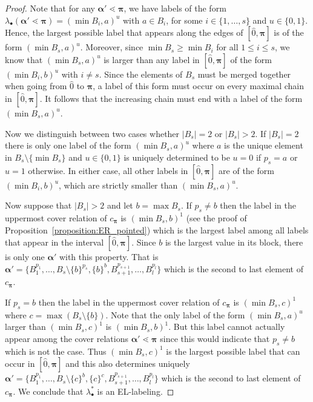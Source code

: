 \documentclass[11pt]{article}
\theoremstyle{definition}
\numberwithin{equation}{section}
\newcommand{\bpi}{\pmb{\pi}}
\newcommand{\balpha}{\pmb{\alpha}}
\begin{document}
\begin{proof}
Note that for any $\balpha'\lessdot \bpi$, we have labels of the form $\lambda_{\bullet}(\balpha'\lessdot \bpi)=(\min B_i,a)^u$ with $a\in B_i$, for some  $i\in\{1,\dots,s\}$ and $u\in\{0,1\}$. Hence,  the largest possible label that appears along the edges of $[\hat{0},\bpi]$ is of the form $(\min B_{s},a)^u$.  Moreover, since $\min B_s \geq \min B_i$ for all $1\leq i\leq s$, we know that $(\min B_{s},a)^u$ is larger than any label in $[\hat{0}, \bpi]$ of the form $(\min B_i, b)^u$ with $i\neq s$.   Since the elements of $B_s$ must be merged together when going from $\hat{0}$ to $\bpi$,  a label of this form must occur on every maximal chain in $[\hat{0},\bpi]$.  It follows that the increasing chain must end with a label of the form $(\min B_{s},a)^u$.  

Now we distinguish between two cases whether $|B_{s}|=2$ or $|B_{s}|>2$. If $|B_{s}|=2$ there is only one label of the form $(\min B_{s},a)^u$ where $a$ is the unique element in $B_{s}\setminus \{\min B_{s}\}$ and $u\in\{0,1\}$ is uniquely determined to be $u=0$ if $p_s=a$ or $u=1$ otherwise. In either case, all other labels in $[\hat{0},\bpi]$ are of the form $(\min B_{i},b)^u$, which are strictly smaller than $(\min B_{s},a)^u$.



Now suppose that $|B_{s}|>2$ and let $b=\max B_s$. If $p_s\neq b$ then the label in the uppermost cover relation of $c_{\bpi}$ is $(\min B_{s},b)^1$ (see the proof of Proposition~\ref{proposition:ER_pointed}) which is the largest label among all labels that appear in the interval $[\hat{0},\bpi]$.  Since $b$ is the largest value in its block, there is only one $\balpha'$ with this property. That is $\balpha'=\{B_1^{p_1},\dots,B_s\setminus\{b\}^{p_s},\{b\}^{b},B_{s+1}^{p_{s+1}},\dots,B_l^{p_l}\}$ which is the second to last element of $c_{\bpi}$. 

If $p_s= b$ then  the label in the uppermost cover relation of $c_{\bpi}$ is $(\min B_{s},c)^1$ where $c=\max (B_s \setminus \{b\})$. Note that the only label of the form $(\min B_{s},a)^u$ larger than   $(\min B_{s},c)^1$ is $(\min B_{s},b)^1$.   
But this label cannot actually appear among the cover relations  $\balpha'\lessdot \bpi$ since this would indicate that $p_s\neq b$ which is not the case. Thus $(\min B_{s},c)^1$ is the largest possible label that can occur  in $[\hat{0}, \bpi]$  and this also determines uniquely $\balpha'=\{B_1^{p_1},\dots,B_s\setminus\{c\}^{b},\{c\}^{c},B_{s+1}^{p_{s+1}},\dots,B_l^{p_l}\}$ which is the second to last element of $c_{\bpi}$. We conclude that $\lambda^*_\bullet$ is an EL-labeling.
\end{proof}
\end{document}
